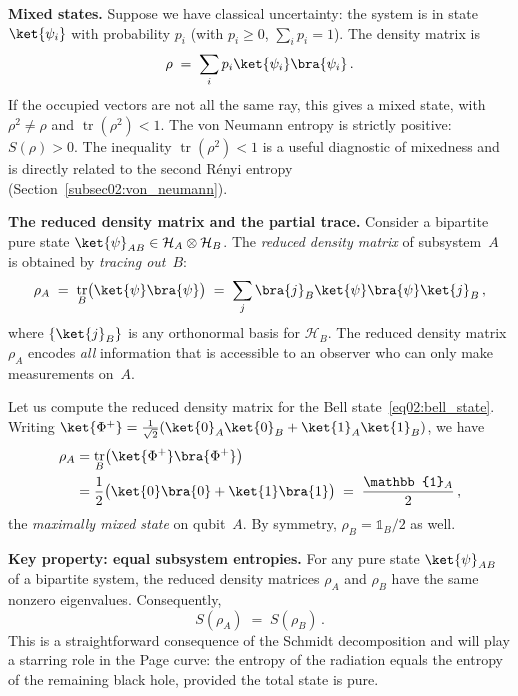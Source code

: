\documentclass[11pt,letterpaper]{article}
\theoremstyle{plain}
\theoremstyle{definition}
\theoremstyle{remark}
\newcommand{\Hcal}{\mathcal{H}}
\DeclareMathOperator{\tr}{tr}
\begin{document}
\medskip
\noindent\textbf{Mixed states.}
Suppose we have classical uncertainty: the system is in state $\ket{\psi_i}$ with
probability $p_i$ (with $p_i\geq 0$, $\sum_i p_i = 1$).  The density matrix is
\begin{equation}\label{eq02:mixed_density}
  \rho \;=\; \sum_i p_i \ket{\psi_i}\bra{\psi_i}\,.
\end{equation}
If the occupied vectors are not all the same ray, this gives a mixed state,
with $\rho^2 \neq \rho$ and $\tr(\rho^2)<1$.  The von Neumann entropy
is strictly positive: $S(\rho)>0$.  The inequality $\tr(\rho^2)<1$ is a useful
diagnostic of mixedness and is directly related to the second R\'{e}nyi entropy
(Section~\ref{subsec02:von_neumann}).

\medskip
\noindent\textbf{The reduced density matrix and the partial trace.}
Consider a bipartite pure state $\ket{\psi}_{AB}\in\Hcal_A\otimes\Hcal_B$.  The
\emph{reduced density matrix} of subsystem~$A$ is obtained by \emph{tracing out}~$B$:
\begin{equation}\label{eq02:partial_trace}
  \rho_A \;=\; \tr_B\bigl(\ket{\psi}\bra{\psi}\bigr)
  \;=\; \sum_j \bra{j}_B \ket{\psi}\bra{\psi}\ket{j}_B\,,
\end{equation}
where $\{\ket{j}_B\}$ is any orthonormal basis for $\Hcal_B$.  The reduced density
matrix $\rho_A$ encodes \emph{all} information that is accessible to an observer
who can only make measurements on~$A$.

Let us compute the reduced density matrix for the Bell state~\eqref{eq02:bell_state}.
Writing $\ket{\Phi^+} = \frac{1}{\sqrt{2}}(\ket{0}_A\ket{0}_B + \ket{1}_A\ket{1}_B)$,
we have
\begin{align}\label{eq02:bell_reduced}
  \rho_A &= \tr_B\bigl(\ket{\Phi^+}\bra{\Phi^+}\bigr) \nonumber\\
  &= \frac{1}{2}\bigl(\ket{0}\bra{0} + \ket{1}\bra{1}\bigr)
  \;=\; \frac{\mathbb{1}_A}{2}\,,
\end{align}
the \emph{maximally mixed state} on qubit~$A$.  By symmetry, $\rho_B =
\mathbb{1}_B/2$ as well.

\medskip
\noindent\textbf{Key property: equal subsystem entropies.}
For any pure state $\ket{\psi}_{AB}$ of a bipartite system, the reduced density
matrices $\rho_A$ and $\rho_B$ have the same nonzero eigenvalues.  Consequently,
\begin{equation}\label{eq02:equal_entropies}
  S(\rho_A) \;=\; S(\rho_B)\,.
\end{equation}
This is a straightforward consequence of the Schmidt decomposition and will play a
starring role in the Page curve: the entropy of the radiation equals the entropy of
the remaining black hole, provided the total state is pure.
\end{document}
